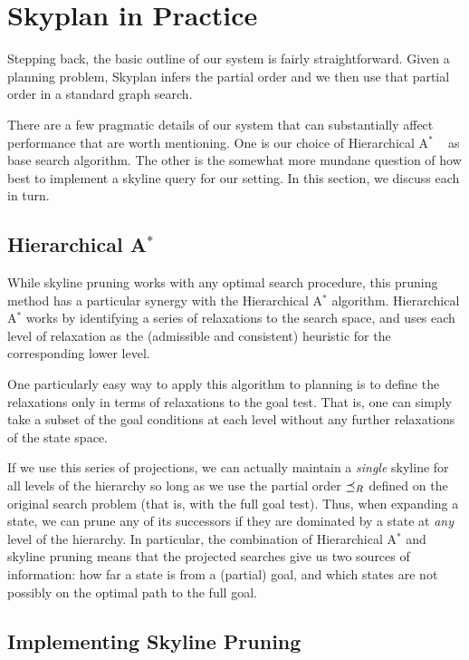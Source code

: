 \documentclass[letterpaper]{article}
\theoremstyle{plain} \newtheorem{theorem}{Theorem} \newtheorem{proposition}{Proposition} \newtheorem{lemma}{Lemma}
\theoremstyle{definition} \newtheorem{definition}{Definition} \newtheorem{conjecture}{Conjecture} \newtheorem*{example}{Example}
\theoremstyle{remark} \newtheorem*{remark}{Remark} \newtheorem*{note}{Note} \newtheorem{case}{Case}
\newcommand{\Astar}{A$^*$ }
\begin{document}
\section{Skyplan in Practice}

Stepping back, the basic outline of our system is fairly straightforward.
Given a planning problem, Skyplan infers the partial order
and we then use that partial order in a standard graph search.

There are a few pragmatic details of our system that can substantially
affect performance that are worth mentioning. One is our choice of
Hierarchical \Astar~\citep{holte1996hierarchical} as base search
algorithm. The
other is the somewhat more mundane question of how best to implement
a skyline query for our setting.  In this section, we discuss each
in turn.

\subsection{Hierarchical \Astar}

While skyline pruning works with any optimal search procedure, this
pruning method has a particular synergy with the Hierarchical \Astar
algorithm. Hierarchical \Astar works
by identifying a series of relaxations to the search space, and
uses each level of relaxation as the (admissible and consistent)
heuristic for the corresponding lower level.

One particularly easy way to apply this algorithm to planning is
to define the relaxations only in terms of relaxations to the goal
test. That is, one can simply take a subset of the goal conditions
at each level without any further relaxations of the state space. 

If we use this series of projections, we can actually maintain a
\textit{single} skyline for all levels of the hierarchy so long as
we use the partial order $\preceq_R$ defined on the original search problem
(that is, with the full goal test). Thus, when expanding a 
state, we can prune any of its successors if they are dominated
by a state at \textit{any} level of the hierarchy.  In particular,
the combination of Hierarchical \Astar and skyline pruning means
that the projected searches give us two sources of information: how
far a state is from a (partial) goal, and which states are not
possibly on the optimal path to the full goal. 

\subsection{Implementing Skyline Pruning}
\end{document}
